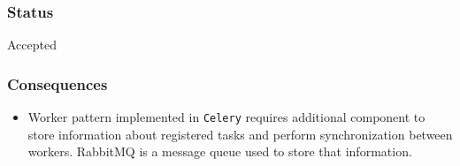 \subsubsection{Status}\label{status}

Accepted

\subsubsection{Consequences}\label{consequences}

\begin{itemize}
\tightlist
\item
  Worker pattern implemented in \texttt{Celery} requires additional
  component to store information about registered tasks and perform
  synchronization between workers. RabbitMQ is a message queue used to
  store that information.
\end{itemize}
